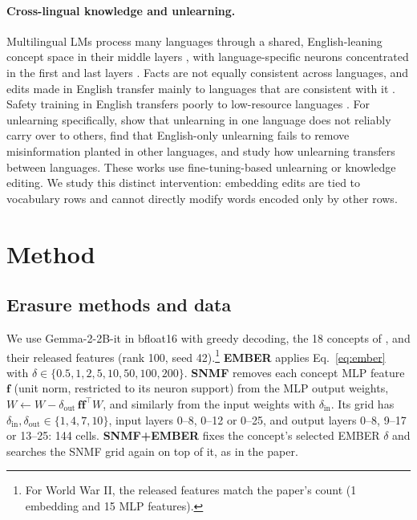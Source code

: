 \documentclass[11pt]{article}
\begin{document}
\paragraph{Cross-lingual knowledge and unlearning.}
Multilingual LMs process many languages through a shared, English-leaning concept space in their middle layers \citep{wendler2024llamas}, with language-specific neurons concentrated in the first and last layers \citep{tang2024languagespecific}.
Facts are not equally consistent across languages, and edits made in English transfer mainly to languages that are consistent with it \citep{qi2023crosslingual,wang2024crosslingualediting}.
Safety training in English transfers poorly to low-resource languages \citep{deng2024multilingual,yong2023lowresource}.
For unlearning specifically, \citet{choi2024crosslingual} show that unlearning in one language does not reliably carry over to others, \citet{lu2025learn} find that English-only unlearning fails to remove misinformation planted in other languages, and \citet{farashah2026amnesia} study how unlearning transfers between languages.
These works use fine-tuning-based unlearning or knowledge editing.
We study this distinct intervention: embedding edits are tied to vocabulary rows and cannot directly modify words encoded only by other rows.

\section{Method}

\subsection{Erasure methods and data}
We use Gemma-2-2B-it \citep{gemma2024gemma2} in bfloat16 with greedy decoding, the 18 concepts of \citet{suslik2026ember}, and their released features (rank 100, seed 42).\footnote{For World War II, the released features match the paper's count (1 embedding and 15 MLP features).}
\textbf{EMBER} applies Eq.~\ref{eq:ember} with $\delta \in \{0.5,1,2,5,10,50,100,200\}$.
\textbf{SNMF} removes each concept MLP feature $\mathbf{f}$ (unit norm, restricted to its neuron support) from the MLP output weights, $W \leftarrow W - \delta_{\text{out}}\,\mathbf{f}\mathbf{f}^\top W$, and similarly from the input weights with $\delta_{\text{in}}$.
Its grid has $\delta_{\text{in}},\delta_{\text{out}} \in \{1,4,7,10\}$, input layers 0--8, 0--12 or 0--25, and output layers 0--8, 9--17 or 13--25: 144 cells.
\textbf{SNMF+EMBER} fixes the concept's selected EMBER $\delta$ and searches the SNMF grid again on top of it, as in the paper.
\end{document}
